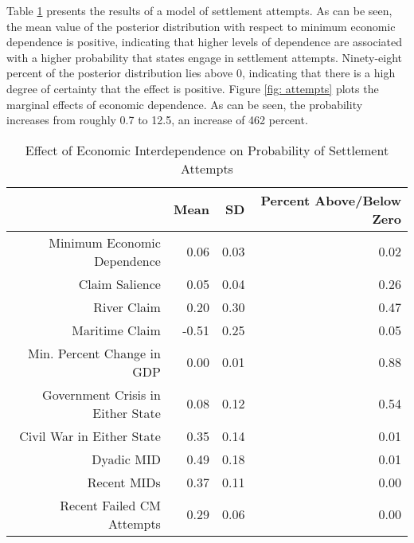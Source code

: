 Table \ref{tab: attempts} presents the results of a model of settlement attempts. As can be seen, the mean value of the posterior distribution with respect to minimum economic dependence is positive, indicating that higher levels of dependence are associated with a higher probability that states engage in settlement attempts. Ninety-eight percent of the posterior distribution lies above 0, indicating that there is a high degree of certainty that the effect is positive.  Figure \ref{fig: attempts} plots the marginal effects of economic dependence. As can be seen, the probability increases from roughly 0.7 to 12.5, an increase of 462 percent.

\begin{table}[ht]

\caption{Effect of Economic Interdependence on Probability of Settlement Attempts}

\label{tab: attempts}

\centering

\begin{tabular}{rrrr}

\toprule

& Mean & SD & Percent Above/Below Zero \\ 

\midrule

Minimum Economic Dependence & 0.06 & 0.03 & 0.02 \\ 

Claim Salience & 0.05 & 0.04 & 0.26 \\ 

River Claim & 0.20 & 0.30 & 0.47 \\ 

Maritime Claim & -0.51 & 0.25 & 0.05 \\ 

Min. Percent Change in GDP & 0.00 & 0.01 & 0.88 \\ 

Government Crisis in Either State & 0.08 & 0.12 & 0.54 \\ 

Civil War in Either State & 0.35 & 0.14 & 0.01 \\ 

Dyadic MID & 0.49 & 0.18 & 0.01 \\ 

Recent MIDs & 0.37 & 0.11 & 0.00 \\ 

Recent Failed CM Attempts & 0.29 & 0.06 & 0.00 \\ 


\end{tabular}
\end{table}
